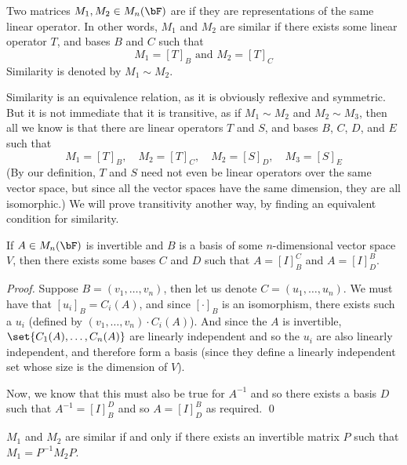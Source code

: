 \begin{defn*}

    Two matrices $M_1,M_2\in M_n(\bF)$ are  if they are representations of the same linear operator.
    In other words, $M_1$ and $M_2$ are similar if there exists some linear operator $T$, and bases $B$ and $C$ such that
    \[ M_1 = [T]_B \text{ and } M_2 = [T]_C \]
    Similarity is denoted by $M_1\sim M_2$.

\end{defn*}

Similarity is an equivalence relation, as it is obviously reflexive and symmetric.
But it is not immediate that it is transitive, as if $M_1\sim M_2$ and $M_2\sim M_3$, then all we know is that there are linear operators $T$ and $S$, and bases $B$, $C$, $D$, and $E$ such that
\[ M_1 = [T]_B,\quad M_2 = [T]_C,\quad M_2=[S]_D,\quad M_3=[S]_E \]
(By our definition, $T$ and $S$ need not even be linear operators over the same vector space, but since all the vector spaces have the same dimension, they are all isomorphic.)
We will prove transitivity another way, by finding an equivalent condition for similarity.

\begin{lemm*}

    If $A\in M_n(\bF)$ is invertible and $B$ is a basis of some $n$-dimensional vector space $V$, then there exists some bases $C$ and $D$ such that $A=[I]^C_B$ and $A=[I]^B_D$.

\end{lemm*}

\begin{proof}

    Suppose $B=(v_1,\dots,v_n)$, then let us denote $C=(u_1,\dots,u_n)$.
    We must have that $[u_i]_B=C_i(A)$, and since $[\cdot]_B$ is an isomorphism, there exists such a $u_i$ (defined by $(v_1,\dots,v_n)\cdot C_i(A)$).
    And since the $A$ is invertible, $\set{C_1(A),\dots,C_n(A)}$ are linearly independent and so the $u_i$ are also linearly independent, and therefore form a basis (since they define a linearly independent
    set whose size is the dimension of $V$).

    Now, we know that this must also be true for $A^{-1}$ and so there exists a basis $D$ such that $A^{-1}=[I]^D_B$ and so $A=[I]^B_D$ as required.
    \qed

\end{proof}

\begin{thrm*}

    $M_1$ and $M_2$ are similar if and only if there exists an invertible matrix $P$ such that $M_1=P^{-1}M_2P$.

\end{thrm*}

